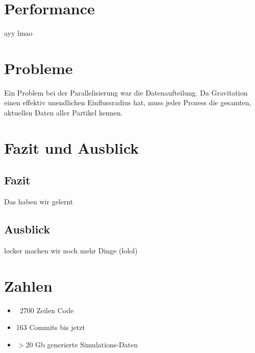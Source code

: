 \section{Performance}
ayy lmao

\section{Probleme}
Ein Problem bei der Parallelisierung war die Datenaufteilung. Da Gravitation einen effektiv
unendlichen Einflussradius hat, muss jeder Prozess die gesamten, aktuellen Daten aller
Partikel kennen.

\section{Fazit und Ausblick}
\subsection{Fazit}
Das haben wir gelernt
\subsection{Ausblick}
locker machen wir noch mehr Dinge (lolol)

\section{Zahlen}
\begin{itemize}
    \item ~2700 Zeilen Code
    \item 163 Commits bis jetzt
    \item $>$20 Gb generierte Simulations-Daten
\end{itemize}

